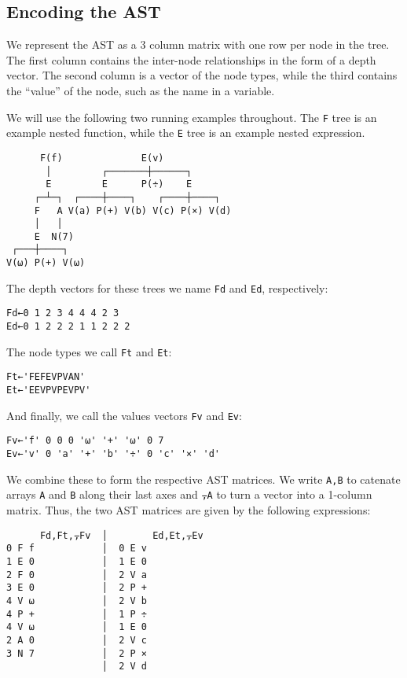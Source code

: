 \documentclass[numbers,9pt]{sigplanconf}
\begin{document}
\subsection{Encoding the AST}

We represent the AST as a 3 column matrix with one row per node in the tree.
The first column contains the inter-node
relationships in the form of a depth vector. The second column is a
vector of the node types, while the third contains the ``value''
of the node, such as the name in a variable.

We will use the following two running examples throughout. The \verb;F; 
tree is an example nested function, while the \verb;E; tree is an example 
nested expression.

\begin{verbatim}
      F(f)              E(v)
       │         ┌───────┼──────┐
       E         E      P(÷)    E
     ┌─┴─┐  ┌────┼────┐    ┌────┼────┐
     F   A V(a) P(+) V(b) V(c) P(×) V(d)
     │   │
     E  N(7) 
 ┌───┼────┐
V(⍵) P(+) V(⍵)
\end{verbatim}

\noindent
The depth vectors for these trees we name \verb;Fd; and \verb;Ed;, respectively:

\begin{verbatim}
Fd←0 1 2 3 4 4 4 2 3
Ed←0 1 2 2 2 1 1 2 2 2
\end{verbatim}

\noindent
The node types we call \verb;Ft; and \verb;Et;:

\begin{verbatim}
Ft←'FEFEVPVAN'
Et←'EEVPVPEVPV'
\end{verbatim}

\noindent
And finally, we call the values vectors \verb;Fv; and \verb;Ev;:

\begin{verbatim}
Fv←'f' 0 0 0 '⍵' '+' '⍵' 0 7
Ev←'v' 0 'a' '+' 'b' '÷' 0 'c' '×' 'd'
\end{verbatim}

\noindent
We combine these to form the respective AST matrices. We write \verb;A,B;
to catenate arrays \verb;A; and \verb;B; along their last axes and \verb;⍪A; to turn a
vector into a 1-column matrix. Thus, the two AST matrices are given
by the following expressions:

\begin{verbatim}
      Fd,Ft,⍪Fv  │        Ed,Et,⍪Ev
0 F f            │  0 E v
1 E 0            │  1 E 0
2 F 0            │  2 V a
3 E 0            │  2 P +
4 V ⍵            │  2 V b
4 P +            │  1 P ÷
4 V ⍵            │  1 E 0
2 A 0            │  2 V c
3 N 7            │  2 P ×
                 │  2 V d
\end{verbatim}
\end{document}
